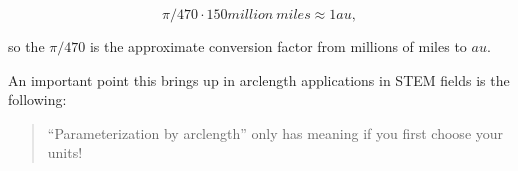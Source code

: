 \documentclass{ximera}
\begin{document}
\begin{exercise}
\begin{exercise}
\begin{exercise}
\begin{exercise}
\begin{feedback}[correct]
\[ \pi/470\cdot 150 \unit{million~miles}     \approx 1\unit{au} , \]

so the $\pi/470$ is the approximate conversion factor from millions of miles to $\unit{au}$.

An important point this brings up in arclength applications in STEM fields is the following:

\begin{quote}
``Parameterization by arclength'' only has meaning if you first choose your units!
\end{quote}

\end{feedback}
 
                   \end{exercise}
        \end{exercise}
      \end{exercise}
        \end{exercise}
\end{document}
